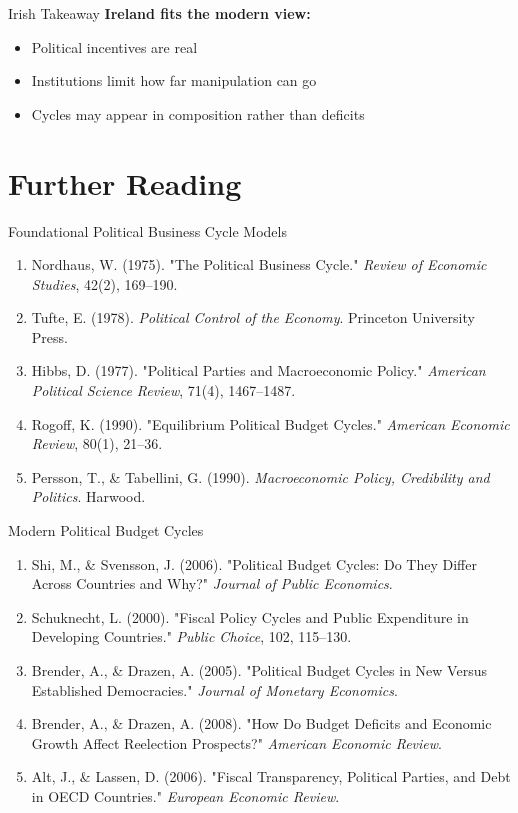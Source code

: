 \documentclass[10pt]{beamer}
\begin{document}
\begin{frame}{Irish Takeaway}
\textbf{Ireland fits the modern view:}

\begin{itemize}
\item Political incentives are real
\item Institutions limit how far manipulation can go
\item Cycles may appear in \alert{composition} rather than deficits
\end{itemize}
\end{frame}


\section*{Further Reading}

\begin{frame}{Foundational Political Business Cycle Models}
\footnotesize
\begin{enumerate}
\item Nordhaus, W. (1975). "The Political Business Cycle." \emph{Review of Economic Studies}, 42(2), 169–190.
\item Tufte, E. (1978). \emph{Political Control of the Economy}. Princeton University Press.
\item Hibbs, D. (1977). "Political Parties and Macroeconomic Policy." \emph{American Political Science Review}, 71(4), 1467–1487.
\item Rogoff, K. (1990). "Equilibrium Political Budget Cycles." \emph{American Economic Review}, 80(1), 21–36.
\item Persson, T., \& Tabellini, G. (1990). \emph{Macroeconomic Policy, Credibility and Politics}. Harwood.
\end{enumerate}
\end{frame}


\begin{frame}{Modern Political Budget Cycles}
\footnotesize
\begin{enumerate}
\item Shi, M., \& Svensson, J. (2006). "Political Budget Cycles: Do They Differ Across Countries and Why?" \emph{Journal of Public Economics}.
\item Schuknecht, L. (2000). "Fiscal Policy Cycles and Public Expenditure in Developing Countries." \emph{Public Choice}, 102, 115–130.
\item Brender, A., \& Drazen, A. (2005). "Political Budget Cycles in New Versus Established Democracies." \emph{Journal of Monetary Economics}.
\item Brender, A., \& Drazen, A. (2008). "How Do Budget Deficits and Economic Growth Affect Reelection Prospects?" \emph{American Economic Review}.
\item Alt, J., \& Lassen, D. (2006). "Fiscal Transparency, Political Parties, and Debt in OECD Countries." \emph{European Economic Review}.
\end{enumerate}
\end{frame}
\end{document}
